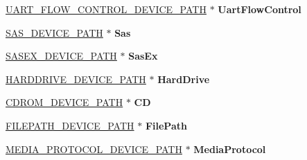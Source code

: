 \begin{DoxyCompactItemize}
\hyperlink{struct_u_a_r_t___f_l_o_w___c_o_n_t_r_o_l___d_e_v_i_c_e___p_a_t_h}{U\+A\+R\+T\+\_\+\+F\+L\+O\+W\+\_\+\+C\+O\+N\+T\+R\+O\+L\+\_\+\+D\+E\+V\+I\+C\+E\+\_\+\+P\+A\+TH} $\ast$ {\bfseries Uart\+Flow\+Control}
\item 
\mbox{\label{union_e_f_i___d_e_v___p_a_t_h___p_t_r_a396ee1df66b700dd058f54f42575d78b}} 
\hyperlink{struct_s_a_s___d_e_v_i_c_e___p_a_t_h}{S\+A\+S\+\_\+\+D\+E\+V\+I\+C\+E\+\_\+\+P\+A\+TH} $\ast$ {\bfseries Sas}
\item 
\mbox{\label{union_e_f_i___d_e_v___p_a_t_h___p_t_r_ad479be0a925e2243472851320d90dbe5}} 
\hyperlink{struct_s_a_s_e_x___d_e_v_i_c_e___p_a_t_h}{S\+A\+S\+E\+X\+\_\+\+D\+E\+V\+I\+C\+E\+\_\+\+P\+A\+TH} $\ast$ {\bfseries Sas\+Ex}
\item 
\mbox{\label{union_e_f_i___d_e_v___p_a_t_h___p_t_r_aece45b6c832bb78a80872aad662bedd3}} 
\hyperlink{struct_h_a_r_d_d_r_i_v_e___d_e_v_i_c_e___p_a_t_h}{H\+A\+R\+D\+D\+R\+I\+V\+E\+\_\+\+D\+E\+V\+I\+C\+E\+\_\+\+P\+A\+TH} $\ast$ {\bfseries Hard\+Drive}
\item 
\mbox{\label{union_e_f_i___d_e_v___p_a_t_h___p_t_r_a3455421cb057f9f2bf6f0a0b9759f5fc}} 
\hyperlink{struct_c_d_r_o_m___d_e_v_i_c_e___p_a_t_h}{C\+D\+R\+O\+M\+\_\+\+D\+E\+V\+I\+C\+E\+\_\+\+P\+A\+TH} $\ast$ {\bfseries CD}
\item 
\mbox{\label{union_e_f_i___d_e_v___p_a_t_h___p_t_r_ae62d0f34ec3f94083bbe07542a5aedd2}} 
\hyperlink{struct_f_i_l_e_p_a_t_h___d_e_v_i_c_e___p_a_t_h}{F\+I\+L\+E\+P\+A\+T\+H\+\_\+\+D\+E\+V\+I\+C\+E\+\_\+\+P\+A\+TH} $\ast$ {\bfseries File\+Path}
\item 
\mbox{\label{union_e_f_i___d_e_v___p_a_t_h___p_t_r_a1918bb0afd11f6838d649193d78251f8}} 
\hyperlink{struct_m_e_d_i_a___p_r_o_t_o_c_o_l___d_e_v_i_c_e___p_a_t_h}{M\+E\+D\+I\+A\+\_\+\+P\+R\+O\+T\+O\+C\+O\+L\+\_\+\+D\+E\+V\+I\+C\+E\+\_\+\+P\+A\+TH} $\ast$ {\bfseries Media\+Protocol}
\item 
\mbox{\label{union_e_f_i___d_e_v___p_a_t_h___p_t_r_a9d5363bf44f79fc9072b1cdb721f635d}} 

\end{DoxyCompactItemize}

